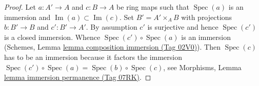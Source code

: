 \documentclass{amsart}
\theoremstyle{plain}
\theoremstyle{definition}
\theoremstyle{remark}
\numberwithin{equation}{subsection}
\def\Spec{\mathop{\mathrm{Spec}}}
\def\Im{\mathop{\mathrm{Im}}}
\begin{document}
\begin{proof}
\medskip\noindent
Let $a : A' \to A$ and $c : B \to A$ be ring maps such that
$\Spec(a)$ is an immersion and $\Im(a) \subset \Im(c)$.
Set $B' = A' \times_A B$ with projections $b : B' \to B$
and $c' : B' \to A'$. By assumption $c'$
is surjective and hence $\Spec(c')$ is a closed immersion.
Whence $\Spec(c') \circ \Spec(a)$ is an immersion
(Schemes, Lemma \href{https://stacks.math.columbia.edu/tag/02V0}{lemma composition immersion (Tag 02V0)}).
Then $\Spec(c)$ has to be an immersion because it factors
the immersion $\Spec(c') \circ \Spec(a) = \Spec(b) \circ \Spec(c)$, see
Morphisms, Lemma \href{https://stacks.math.columbia.edu/tag/07RK}{lemma immersion permanence (Tag 07RK)}.
\end{proof}
\end{document}
